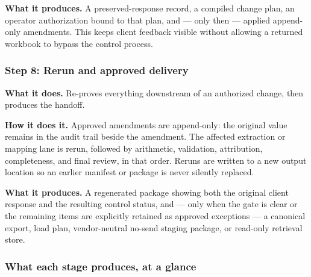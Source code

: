 \documentclass[
]{article}
\begin{document}
\textbf{What it produces.} A preserved-response record, a compiled
change plan, an operator authorization bound to that plan, and --- only
then --- applied append-only amendments. This keeps client feedback
visible without allowing a returned workbook to bypass the control
process.

\subsubsection{Step 8: Rerun and approved
delivery}\label{step-8-rerun-and-approved-delivery}

\textbf{What it does.} Re-proves everything downstream of an authorized
change, then produces the handoff.

\textbf{How it does it.} Approved amendments are append-only: the
original value remains in the audit trail beside the amendment. The
affected extraction or mapping lane is rerun, followed by arithmetic,
validation, attribution, completeness, and final review, in that order.
Reruns are written to a new output location so an earlier manifest or
package is never silently replaced.

\textbf{What it produces.} A regenerated package showing both the
original client response and the resulting control status, and --- only
when the gate is clear or the remaining items are explicitly retained as
approved exceptions --- a canonical export, load plan, vendor-neutral
no-send staging package, or read-only retrieval store.

\subsubsection{What each stage produces, at a
glance}\label{what-each-stage-produces-at-a-glance}
\end{document}
